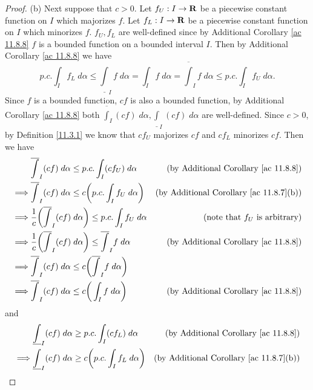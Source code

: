 \begin{proof}{(b)}
    Next suppose that \(c > 0\).
    Let \(f_U : I \to \mathbf{R}\) be a piecewise constant function on \(I\) which majorizes \(f\).
    Let \(f_L : I \to \mathbf{R}\) be a piecewise constant function on \(I\) which minorizes \(f\).
    \(f_U, f_L\) are well-defined since by Additional Corollary \ref{ac 11.8.8} \(f\) is a bounded function on a bounded interval \(I\).
    Then by Additional Corollary \ref{ac 11.8.8} we have
    \[
        p.c. \int_I f_L \; d \alpha \leq \underline{\int}_I f \; d \alpha = \int_I f \; d \alpha = \overline{\int}_I f \; d \alpha \leq p.c. \int_I f_U \; d \alpha.
    \]
    Since \(f\) is a bounded function, \(cf\) is also a bounded function, by Additional Corollary \ref{ac 11.8.8} both \(\overline{\int}_I (cf) \; d \alpha, \underline{\int}_I (cf) \; d \alpha\) are well-defined.
    Since \(c > 0\), by Definition \ref{11.3.1} we know that \(c f_U\) majorizes \(c f\) and \(c f_L\) minorizes \(c f\).
    Then we have
    \begin{align*}
                 & \overline{\int}_I (cf) \; d \alpha \leq p.c. \int_I (c f_U) \; d \alpha                         & \text{(by Additional Corollary \ref{ac 11.8.8})}    \\
        \implies & \overline{\int}_I (cf) \; d \alpha \leq c \bigg(p.c. \int_I f_U \; d \alpha\bigg)               & \text{(by Additional Corollary \ref{ac 11.8.7}(b))} \\
        \implies & \frac{1}{c} \bigg(\overline{\int}_I (cf) \; d \alpha\bigg) \leq p.c. \int_I f_U \; d \alpha     & \text{(note that \(f_U\) is arbitrary)}             \\
        \implies & \frac{1}{c} \bigg(\overline{\int}_I (cf) \; d \alpha\bigg) \leq \overline{\int}_I f \; d \alpha & \text{(by Additional Corollary \ref{ac 11.8.8})}    \\
        \implies & \overline{\int}_I (cf) \; d \alpha \leq c\bigg(\overline{\int}_I f \; d \alpha\bigg)                                                                  \\
        \implies & \overline{\int}_I (cf) \; d \alpha \leq c\bigg(\int_I f \; d \alpha\bigg)                       & \text{(by Additional Corollary \ref{ac 11.8.8})}
    \end{align*}
    and
    \begin{align*}
                 & \underline{\int}_I (cf) \; d \alpha \geq p.c. \int_I (c f_L) \; d \alpha                          & \text{(by Additional Corollary \ref{ac 11.8.8})}    \\
        \implies & \underline{\int}_I (cf) \; d \alpha \geq c \bigg(p.c. \int_I f_L \; d \alpha\bigg)                & \text{(by Additional Corollary \ref{ac 11.8.7}(b))} \\

\end{align*}
\end{proof}
